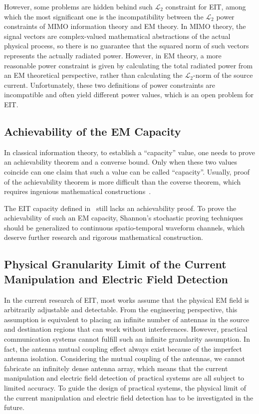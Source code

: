 \documentclass[journal,twocolumn]{IEEEtran}
\begin{document}
However, some problems are hidden behind such $\mathcal{L}_2$ constraint for EIT, among which the most significant one is the incompatibility between the $\mathcal{L}_2$ power constraints of MIMO information theory and EM theory.  
In MIMO theory, the signal vectors are complex-valued mathematical abstractions of the actual physical process, so there is no guarantee that the squared norm of such vectors represents the actually radiated power. 
However, in EM theory, a more reasonable power constraint is given by calculating the total radiated power from an EM theoretical perspective, rather than calculating the $\mathcal{L}_2$-norm of the source current. 
Unfortunately, these two definitions of power constraints are incompatible and often yield different power values, which is an open problem for EIT. 


\subsection{Achievability of the EM Capacity}
In classical information theory, to establish a ``capacity'' value, one needs to prove an achievability theorem and a converse bound. Only when these two values coincide can one claim that such a value can be called  ``capacity''. Usually, proof of the achievability theorem is more difficult than the coverse theorem, which requires ingenious mathematical constructions~\cite{shannon1948mathematical}. 

The EIT capacity defined in~\cite{wan2022mutual,zhang2022pdma} still lacks an achievability proof. 
To prove the achievability of such an EM capacity, Shannon's stochastic proving techniques should be generalized to continuous spatio-temporal waveform channels, which deserve further research and rigorous mathematical construction.  

\subsection{Physical Granularity Limit of the Current Manipulation and Electric Field Detection}
In the current research of EIT, most works assume that the physical EM field is arbitrarily adjustable and detectable. 
From the engineering perspective, this assumption is equivalent to placing an infinite number of antennas in the source and destination regions that can work without interferences. 
However, practical communication systems cannot fulfill such an infinite granularity assumption. 
In fact, the antenna mutual coupling effect always exist because of the imperfect antenna isolation. 
Considering the mutual coupling of the antennas, we cannot fabricate an infinitely dense antenna array, which means that the current manipulation and electric field detection of practical systems are all subject to limited accuracy. 
To guide the design of practical systems, the physical limit of the current manipulation and electric field detection has to be investigated in the future. 
\end{document}
